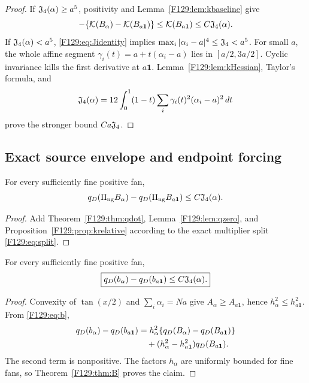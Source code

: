 \begin{proof}
If \(\mathfrak J_4(\alpha)\ge a^5\), positivity and
Lemma~\ref{F129:lem:kbaseline} give
\begin{equation}
 -\{\mathcal K(B_\alpha)-\mathcal K(B_{a\mathbf1})\}
 \le\mathcal K(B_{a\mathbf1})\le C\mathfrak J_4(\alpha).
\end{equation}
If \(\mathfrak J_4(\alpha)<a^5\), \eqref{F129:eq:Jidentity} implies
\(\max_i|\alpha_i-a|^4\le\mathfrak J_4<a^5\).  For small \(a\), the whole affine
segment \(\gamma_i(t)=a+t(\alpha_i-a)\) lies in
\([a/2,3a/2]\).  Cyclic invariance kills the first derivative at
\(a\mathbf1\).  Lemma~\ref{F129:lem:kHessian}, Taylor's formula, and
\begin{equation}
 \mathfrak J_4(\alpha)
 =12\int_0^1(1-t)\sum_i\gamma_i(t)^2(\alpha_i-a)^2\,dt
\end{equation}
prove the stronger bound \(Ca\mathfrak J_4\).
\end{proof}

\subsection{Exact source envelope and endpoint forcing}

\begin{theorem}\label{F129:thm:B}
For every sufficiently fine positive fan,
\begin{equation}\label{F129:eq:B-envelope}
 q_D(\Pi_{\rm ng} B_\alpha)-q_D(\Pi_{\rm ng} B_{a\mathbf1})
 \le C\mathfrak J_4(\alpha).
\end{equation}
\end{theorem}

\begin{proof}
Add Theorem~\ref{F129:thm:qdot}, Lemma~\ref{F129:lem:qzero}, and
Proposition~\ref{F129:prop:krelative} according to the exact multiplier split
\eqref{F129:eq:split}.
\end{proof}

\begin{theorem}\label{F129:thm:b}
For every sufficiently fine positive fan,
\begin{equation}\label{F129:eq:b-envelope}
 \boxed{q_D(b_\alpha)-q_D(b_{a\mathbf1})
 \le C\mathfrak J_4(\alpha).}
\end{equation}
\end{theorem}

\begin{proof}
Convexity of \(\tan(x/2)\) and \(\sum_i\alpha_i=Na\) give
\(A_\alpha\ge A_{a\mathbf1}\), hence
\(h_\alpha^2\le h_{a\mathbf1}^2\).  From \eqref{F129:eq:b},
\begin{align}
 q_D(b_\alpha)-q_D(b_{a\mathbf1})
 &=h_\alpha^2\{q_D(B_\alpha)-q_D(B_{a\mathbf1})\}\notag\\
 &\quad +(h_\alpha^2-h_{a\mathbf1}^2)q_D(B_{a\mathbf1}).\label{F129:eq:area-sign}
\end{align}
The second term is nonpositive.  The factors \(h_\alpha\) are uniformly
bounded for fine fans, so Theorem~\ref{F129:thm:B} proves the claim.
\end{proof}
\endgroup
